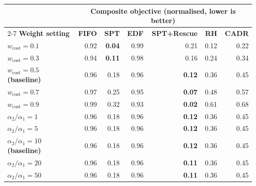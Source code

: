 \begin{tabular}{lrrrrrr}
\toprule
& \multicolumn{6}{c}{\textbf{Composite objective (normalised, lower is better)}} \\
\cmidrule(lr){2-7}
\textbf{Weight setting} & \textbf{FIFO} & \textbf{SPT} & \textbf{EDF} & \textbf{SPT+Rescue} & \textbf{RH} & \textbf{CADR} \\
\midrule
$w_{\text{cost}}=0.1$ & 0.92 & \textbf{0.04} & 0.99 & 0.21 & 0.12 & 0.22 \\
$w_{\text{cost}}=0.3$ & 0.94 & \textbf{0.11} & 0.98 & 0.16 & 0.24 & 0.34 \\
$w_{\text{cost}}=0.5$ \textbf{(baseline)} & 0.96 & 0.18 & 0.96 & \textbf{0.12} & 0.36 & 0.45 \\
$w_{\text{cost}}=0.7$ & 0.97 & 0.25 & 0.95 & \textbf{0.07} & 0.48 & 0.57 \\
$w_{\text{cost}}=0.9$ & 0.99 & 0.32 & 0.93 & \textbf{0.02} & 0.61 & 0.68 \\
\midrule
$\alpha_2/\alpha_1=1$ & 0.96 & 0.18 & 0.96 & \textbf{0.12} & 0.36 & 0.45 \\
$\alpha_2/\alpha_1=5$ & 0.96 & 0.18 & 0.96 & \textbf{0.12} & 0.36 & 0.45 \\
$\alpha_2/\alpha_1=10$ \textbf{(baseline)} & 0.96 & 0.18 & 0.96 & \textbf{0.12} & 0.36 & 0.45 \\
$\alpha_2/\alpha_1=20$ & 0.96 & 0.18 & 0.96 & \textbf{0.11} & 0.36 & 0.45 \\
$\alpha_2/\alpha_1=50$ & 0.96 & 0.18 & 0.96 & \textbf{0.11} & 0.36 & 0.45 \\
\bottomrule
\end{tabular}
